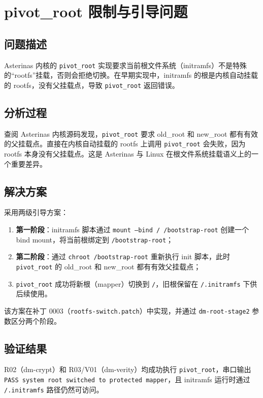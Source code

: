\section{pivot\_root 限制与引导问题}

\subsection{问题描述}

Asterinas 内核的 \texttt{pivot\_root} 实现要求当前根文件系统（initramfs）不是特殊的“rootfs”挂载，否则会拒绝切换。在早期实现中，initramfs 的根是内核自动挂载的 rootfs，没有父挂载点，导致 \texttt{pivot\_root} 返回错误。

\subsection{分析过程}

查阅 Asterinas 内核源码发现，\texttt{pivot\_root} 要求 old\_root 和 new\_root 都有有效的父挂载点。直接在内核自动挂载的 rootfs 上调用 \texttt{pivot\_root} 会失败，因为 rootfs 本身没有父挂载点。这是 Asterinas 与 Linux 在根文件系统挂载语义上的一个重要差异。

\subsection{解决方案}

采用两级引导方案：
\begin{enumerate}
    \item \textbf{第一阶段}：initramfs 脚本通过 \texttt{mount --bind / /bootstrap-root} 创建一个 bind mount，将当前根绑定到 \texttt{/bootstrap-root}；
    \item \textbf{第二阶段}：通过 \texttt{chroot /bootstrap-root} 重新执行 init 脚本，此时 \texttt{pivot\_root} 的 old\_root 和 new\_root 都有有效父挂载点；
    \item \texttt{pivot\_root} 成功将新根（mapper）切换到 \texttt{/}，旧根保留在 \texttt{/.initramfs} 下供后续使用。
\end{enumerate}

该方案在补丁 0003（\texttt{rootfs-switch.patch}）中实现，并通过 \texttt{dm-root-stage2} 参数区分两个阶段。

\subsection{验证结果}

R02（dm-crypt）和 R03/V01（dm-verity）均成功执行 \texttt{pivot\_root}，串口输出 \texttt{PASS system root switched to protected mapper}，且 initramfs 运行时通过 \texttt{/.initramfs} 路径仍然可访问。

